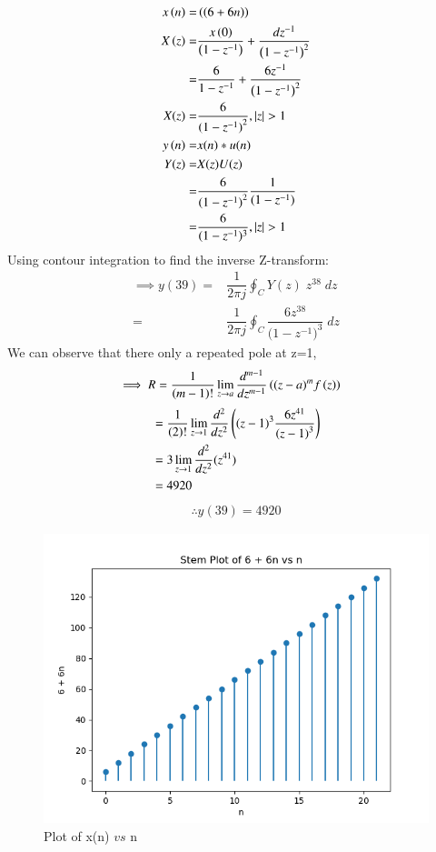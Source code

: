 \documentclass[journal,12pt,twocolumn]{IEEEtran}
\theoremstyle{remark}
\begin{document}
\begin{align}
x\brak{n}= &\brak{\brak{6+6n}}\\
X\brak{z}= &\frac {x\brak{0}} {\brak{1-z^{-1}}} + \frac {dz^{-1}} {\brak{1-z^{-1}}^2} \\
= &\frac6{1-z^{-1}} + \frac{6z^{-1}}{\brak{1-z^{-1}}^{2}}\\
X(z)=& \frac6{{(1-z^{-1})}^2} , |z|>1\\
y\brak{n}=& x(n)* u(n)\\
Y(z)=& X(z)U(z) \\
= & \frac6{{(1-z^{-1})}^2}\frac1 {(1-z^{-1})} \\
=& \frac{6}{(1-z^{-1})^{3}}, |z|>1
\end{align}
Using contour integration to find the inverse Z-transform:\\
\begin{align}
    \implies y(39)=&\dfrac{1}{2\pi j}\oint_{C}Y(z) \;z^{38} \;dz\\
    =&\dfrac{1}{2\pi j}\oint_{C}\dfrac{6z^{38}}{({1-z^{-1})}^{3}} \;dz 
\end{align}
We can observe that there only a repeated pole at z=1,
\begin{align}
    \implies R&=\dfrac{1}{\left(m-1\right)!}\lim\limits_{z\to a}\dfrac{d^{m-1}}{dz^{m-1}}\left({(z-a)}^{m}f\left(z\right)\right)  
\end{align}
\begin{align}
    &=\dfrac{1}{\left(2\right)!}\lim\limits_{z\to 1}\dfrac{d^{2}}{dz^{2}}\left({(z-1)}^{3}\dfrac{6z^{41}}{{(z-1)}^3}\right)   \\
    &=3\lim\limits_{z\to 1}\dfrac{d^2}{dz^2}(z^{41})\\
    &=4920
\end{align}
\begin{align}
    \therefore \boxed{y(39)=4920}
\end{align}
\begin{figure}[ht]
    \centering
    \includegraphics[width=\columnwidth]{figs/figure1.png}
    \caption{Plot of x(n) $vs$ n}
    \label{fig: 10.5.3.12}
\end{figure}
\end{document}
